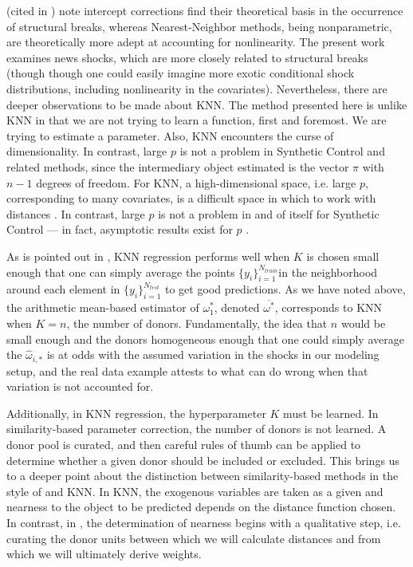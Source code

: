 \documentclass{uiucthesis2021}
\newcommand{\weight}{\pi}
\theoremstyle{definition}
\begin{document}
\cite[][]{clements1996intercept} (cited in \cite[][]{guerron2017macroeconomic})  note intercept corrections find their theoretical basis in the occurrence of structural breaks, whereas Nearest-Neighbor methods, being nonparametric, are theoretically more adept at accounting for nonlinearity.  The present work examines news shocks, which are more closely related to structural breaks (though though one could easily imagine more exotic conditional shock distributions, including nonlinearity in the covariates).  Nevertheless, there are deeper observations to be made about KNN.  The method presented here is unlike KNN in that we are not trying to learn a function, first and foremost.  We are trying to estimate a parameter.  Also, KNN encounters the curse of dimensionality.  In contrast, large $p$ is not a problem in Synthetic Control and related methods, since the intermediary object estimated is the vector $\weight$ with $n-1$ degrees of freedom.  For KNN, a high-dimensional space, i.e. large $p$, corresponding to many covariates, is a difficult space in which to work with distances \parencite[][]{hastie2009elements}.  In contrast, large $p$ is not a problem in and of itself for Synthetic Control --- in fact, asymptotic results exist for $p$ \parencite[][]{abadie2010synthetic}.  

As is pointed out in \cite[][]{hastie2009elements}, KNN regression performs well when $K$ is chosen small enough that one can simply average the points $\{y_{i}\}_{i=1}^{N_{train}}$in the neighborhood around each element in $\{y_{i}\}_{i=1}^{N_{test}}$ to get good predictions.  As we have noted above, the arithmetic mean-based estimator of $\omega_{1}^{*}$, denoted $\overline{\omega^{*}}$, corresponds to KNN when $K = n$, the number of donors.  Fundamentally, the idea that $n$ would be small enough and the donors homogeneous enough that one could simply average the $\hat\omega_{i,*}$ is at odds with the assumed variation in the shocks in our modeling setup, and the real data example attests to what can do wrong when that variation is not accounted for.

Additionally, in KNN regression, the hyperparameter $K$ must be learned.  In similarity-based parameter correction, the number of donors is not learned.  A donor pool is curated, and then careful rules of thumb can be applied to determine whether a given donor should be included or excluded.  This brings us to a deeper point about the distinction between similarity-based methods in the style of \cite[][]{lin2021minimizing} and KNN.  In KNN, the exogenous variables are taken as a given and nearness to the object to be predicted depends on the distance function chosen.  In contrast, in \cite[][]{lin2021minimizing}, the determination of nearness begins with a qualitative step, i.e. curating the donor units between which we will calculate distances and from which we will ultimately derive weights.
\end{document}
